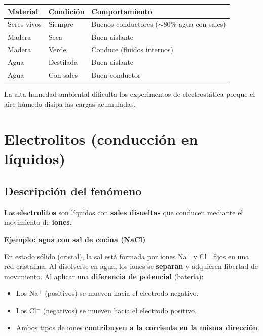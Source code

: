 \documentclass[12pt,a4paper]{article}
\begin{document}
\begin{center}
\begin{tabular}{lll}
\toprule
\textbf{Material} & \textbf{Condición} & \textbf{Comportamiento} \\
\midrule
Seres vivos  & Siempre & Buenos conductores ($\sim 80\%$ agua
                           con sales) \\
Madera       & Seca     & Buen aislante \\
Madera       & Verde    & Conduce (fluidos internos) \\
Agua         & Destilada & Buen aislante \\
Agua         & Con sales & Buen conductor \\
\bottomrule
\end{tabular}
\end{center}

\begin{warnbox}
  La alta humedad ambiental dificulta los experimentos de electrostática
  porque el aire húmedo disipa las cargas acumuladas.
\end{warnbox}

\section{Electrolitos (conducción en líquidos)}

\subsection{Descripción del fenómeno}

Los \textbf{electrolitos} son líquidos con \textbf{sales disueltas} que
conducen mediante el movimiento de \textbf{iones}.

\textbf{Ejemplo: agua con sal de cocina (NaCl)}

En estado sólido (cristal), la sal está formada por iones Na$^{+}$ y
Cl$^{-}$ fijos en una red cristalina. Al disolverse en agua, los iones
se \textbf{separan} y adquieren libertad de movimiento. Al aplicar una
\textbf{diferencia de potencial} (batería):
\begin{itemize}[nosep]
  \item Los Na$^{+}$ (positivos) se mueven hacia el electrodo negativo.
  \item Los Cl$^{-}$ (negativos) se mueven hacia el electrodo positivo.
  \item Ambos tipos de iones \textbf{contribuyen a la corriente en la
        misma dirección}.
\end{itemize}
\end{document}
